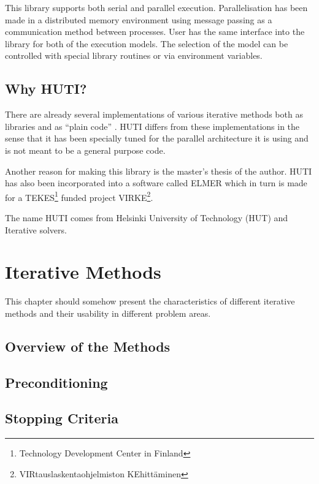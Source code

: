 \documentclass[11pt,a4paper,english,oneside]{report}
\begin{document}
This library supports both serial and parallel execution. Parallelisation
has been made in a distributed memory environment using message passing
as a communication method between processes. User has the same interface
into the library for both of the execution models. The selection of the
model can be controlled with special library routines or via environment
variables.

\section{Why HUTI?}

There are already several implementations of various iterative
methods both as libraries and as ``plain code''
\cite{Cun95,Bal95,Saa95,Fre96}.
HUTI differs from these implementations in the sense that it has been
specially tuned for the parallel architecture it is using and is
not meant to be a general purpose code.

Another reason for making this library is the
master's thesis of the author. HUTI has also been incorporated into
a software called ELMER which in turn is made for a
TEKES\footnote{Technology Development Center in Finland}
funded project VIRKE\footnote{VIRtauslaskentaohjelmiston KEhittäminen}.

The name HUTI comes from Helsinki University of Technology (HUT) and
Iterative solvers.


\chapter{Iterative Methods}
\label{ch:methods}

This chapter should somehow present the characteristics of different
iterative methods and their usability in different problem areas.

\section{Overview of the Methods}
\section{Preconditioning}
\section{Stopping Criteria}
\end{document}
